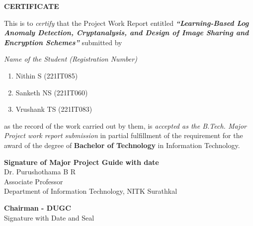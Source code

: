 \begin{framed}
    \begin{center}
        \textbf{{\Large CERTIFICATE}}
    \end{center}
    \null
    This is to \textit{certify} that the Project Work Report entitled \textit{\textbf{``Learning-Based Log Anomaly Detection, Cryptanalysis, and Design of Image Sharing and Encryption Schemes''}} submitted by

    \textit{Name of the Student (Registration Number)}
    \begin{enumerate}[label={(\arabic*)}]
        \item Nithin S (221IT085)\hspace{0.5em}
        \item Sanketh NS (221IT060)
        \item Vrushank TS (221IT083)
    \end{enumerate}
    as the record of the work carried out by them, is \textit{accepted as the B.Tech. Major Project work report submission} in partial fulfillment of the requirement for the award of the degree of \textbf{Bachelor of Technology} in Information Technology.

    \vspace{1cm}
    \begin{minipage}{14cm}
        \begin{center}
            \vspace{1.5cm}
            \textbf{Signature of Major Project Guide with date}
            \\Dr. Purushothama B R
            \\Associate Professor
            \\Department of Information Technology, NITK Surathkal
        \end{center}
        \vspace{0.75cm}
        \begin{center}
            \vspace{1.5cm}
            \textbf{Chairman - DUGC}
            \\{Signature with Date and Seal}
        \end{center}
    \end{minipage}

    \vspace{2cm}
\end{framed}